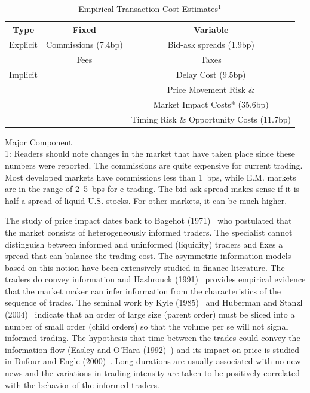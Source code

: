 \begin{table}[!ht]
	\caption{Empirical Transaction Cost Estimates$^1$ \label{tab:empttrans}}	
		\begin{tabular}{|c|c|c|}
		Type & Fixed & Variable\\ \hline
		\hline
		Explicit & Commissions (7.4bp) & Bid-ask spreads (1.9bp)\\ \hline
		& Fees & Taxes\\ \hline
		\hline
		Implicit & & Delay Cost (9.5bp)\\ \hline
		 & & Price Movement Risk \& \\
		 & & Market Impact Costs* (35.6bp)\\ \hline
		 & & Timing Risk \& Opportunity Costs (11.7bp)\\ \hline 
		\end{tabular}
{\small *Major Component \\ 1: Readers should note changes in the market that have taken place since these numbers were reported. The commissions are quite expensive for current trading. Most developed markets  have commissions less than 1~bps, while E.M. markets are in the range of 2--5~bps for e-trading. The bid-ask spread makes sense if it is half a spread of liquid U.S. stocks. For other markets, it can be much higher.}
\end{table}


The study of price impact dates back to Bagehot (1971)~\cite{bagehot} who postulated that the market consists of heterogeneously informed traders. The specialist cannot distinguish between informed and uninformed (liquidity) traders and fixes a spread that can balance the trading cost. The asymmetric information models based on this notion have been extensively studied in finance literature. The traders do convey information and Hasbrouck (1991)~\cite{hasbrouk} provides empirical evidence that the market maker can infer information from the characteristics of the sequence of trades. The seminal work by Kyle (1985)~\cite{kyle1985} and Huberman and Stanzl (2004)~\cite{huberstan} indicate that an order of large size (parent order) must be sliced into a number of small order (child orders) so that the volume per se will not signal informed trading. The hypothesis that time between the trades could convey the information flow (Easley and O'Hara (1992)~\cite{easleyo}) and its impact on price is studied in Dufour and Engle (2000)~\cite{dufour}. Long durations are usually associated with no new news and the variations in trading intensity are taken to be positively correlated with the behavior of the informed traders. \\


